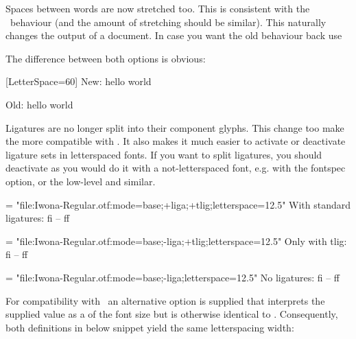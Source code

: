          Spaces between words are now
         stretched too. This is consistent with the \XeTeX\ behaviour (and the amount of stretching should be similar). This
         naturally changes the output of a document.  In case you want the old behaviour back use
         \beginlisting
         \endlisting

         The difference between both options is obvious:

         \begingroup
         [LetterSpace=60]
          New: hello world


          Old: hello world

          \endgroup


         Ligatures  are no longer split into their component glyphs.
         This change too make the  more compatible with
         \XeTeX. It also makes it much easier to activate or deactivate ligature sets in letterspaced fonts.
         If you want to split ligatures, you should deactivate as you would do it with a not-letterspaced font, e.g. with the fontspec  option, or the low-level  and similar.


         {\font \test = "file:Iwona-Regular.otf:mode=base;+liga;+tlig;letterspace=12.5"
          \test With standard ligatures: fi -- ff\par

          \font \test = "file:Iwona-Regular.otf:mode=base;-liga;+tlig;letterspace=12.5"
          \test Only with tlig: fi -- ff \par

          \font \test = "file:Iwona-Regular.otf:mode=base;-liga;letterspace=12.5"
          \test No ligatures: fi -- ff \par
         }

         For compatibility with \XeTeX\ an alternative
          option is supplied that interprets the
         supplied value as a  of the font size but
         is otherwise identical to .
         Consequently, both definitions in below snippet yield the same
         letterspacing width:

